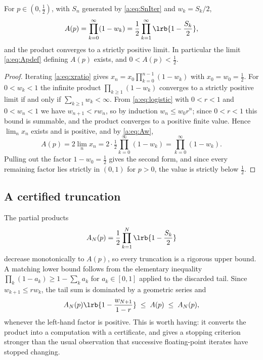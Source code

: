 \begin{proposition}
\label{a:prop:product}
For $p\in(0,\tfrac12)$, with $S_n$ generated by \cref{a:eq:SnIter} and
$w_k = S_k/2$,
\begin{equation}
\label{a:eq:prodFormula}
A(p) = \prod_{k=0}^{\infty}(1-w_k)
= \frac12\prod_{k=1}^{\infty}\lrb{1-\frac{S_k}{2}} ,
\end{equation}
and the product converges to a strictly positive limit. In particular the limit
\cref{a:eq:Apdef} defining $A(p)$ exists, and $0<A(p)<\tfrac12$.
\end{proposition}

\begin{proof}
Iterating \cref{a:eq:xratio} gives $x_n = x_0\prod_{k=0}^{n-1}(1-w_k)$ with
$x_0 = w_0 = \tfrac12$. For $0<w_k<1$ the infinite product $\prod_{k\ge1}(1-w_k)$
converges to a strictly positive limit if and only if $\sum_{k\ge1}w_k<\infty$.
From \cref{a:eq:logistic} with $0<r<1$ and $0<w_n<1$ we have $w_{n+1}<rw_n$, so by
induction $w_n\le w_0r^n$; since $0<r<1$ this bound is summable, and the product
converges to a positive finite value. Hence $\lim_nx_n$ exists and is positive, and
by \cref{a:eq:Aw},
\begin{equation*}
A(p) = 2\lim_nx_n = 2\cdot\tfrac12\prod_{k=0}^{\infty}(1-w_k)
= \prod_{k=0}^{\infty}(1-w_k) .
\end{equation*}
Pulling out the factor $1-w_0 = \tfrac12$ gives the second form, and since every
remaining factor lies strictly in $(0,1)$ for $p>0$, the value is strictly below
$\tfrac12$.
\end{proof}

\subsection{A certified truncation}
\label{a:sec:producttail}

The partial products
\begin{equation}
\label{a:eq:partialproduct}
A_N(p) = \frac12\prod_{k=1}^{N}\lrb{1-\frac{S_k}{2}}
\end{equation}
decrease monotonically to $A(p)$, so every truncation is a rigorous upper bound. A
matching lower bound follows from the elementary inequality
$\prod_k(1-a_k)\ge1-\sum_ka_k$ for $a_k\in[0,1]$ applied to the discarded tail.
Since $w_{k+1}\le rw_k$, the tail sum is dominated by a geometric series and
\begin{equation}
\label{a:eq:producttailbound}
A_N(p)\lrb{1-\frac{w_{N+1}}{1-r}} \;\le\; A(p) \;\le\; A_N(p),
\end{equation}
whenever the left-hand factor is positive. This is worth having: it converts the
product into a computation with a certificate, and gives a stopping criterion
stronger than the usual observation that successive floating-point iterates have
stopped changing.

